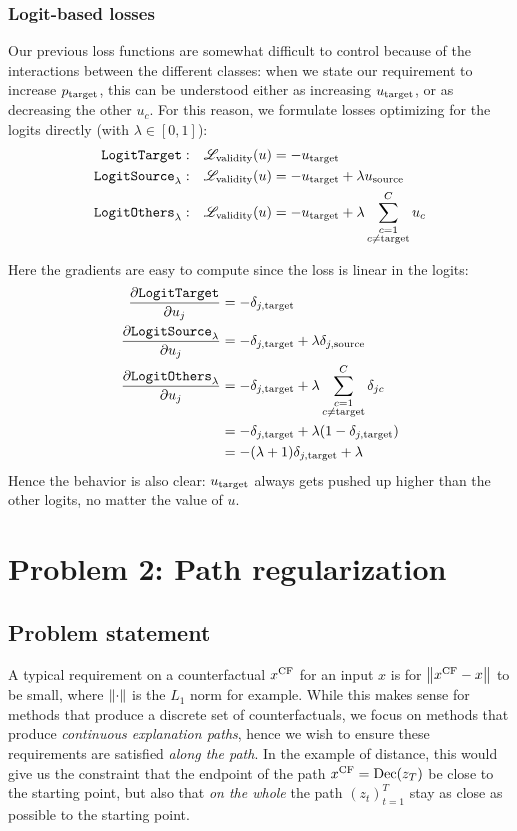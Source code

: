 \documentclass[../main.tex]{subfiles}
\begin{document}
\subsubsection{Logit-based losses}

Our previous loss functions are somewhat difficult to control because of the interactions between the different classes:
when we state our requirement to increase $p_{\mathrm{target}}$, this can be understood either as increasing $u_{\mathrm{target}}$, or as decreasing the other $u_c$.
For this reason, we formulate losses optimizing for the logits directly (with $\lambda \in [0, 1]$):
\begin{align*}
    \mathtt{LogitTarget}{}:        & \quad    \mathscr{L}_\text{validity}(u) = - u_{\mathrm{target}}                         \\
    \mathtt{LogitSource}_{\lambda}: & \quad     \mathscr{L}_\text{validity}(u) = - u_{\mathrm{target}} + \lambda u_{\mathrm{source}}    \\
    \mathtt{LogitOthers}_{\lambda}: & \quad    \mathscr{L}_\text{validity}(u) = - u_{\mathrm{target}} + \lambda \sum_{\substack{{c}=1 \\ {c} \neq \mathrm{target}}}^C u_c
\end{align*}

Here the gradients are easy to compute since the loss is linear in the logits:
\begin{align*}
\frac{\partial \mathtt{LogitTarget}{}}{\partial u_j} &= - \delta_{j, \mathrm{target}}                         \\
\frac{\partial \mathtt{LogitSource}_{\lambda}}{\partial u_j} &= - \delta_{j, \mathrm{target}} + \lambda \delta_{j, \mathrm{source}}                        \\
\frac{\partial \mathtt{LogitOthers}_{\lambda}}{\partial u_j}
&= - \delta_{j, \mathrm{target}} + \lambda \sum_{\substack{{c}=1 \\ {c} \neq \mathrm{target}}}^C \delta_{jc} \\
&= - \delta_{j, \mathrm{target}} + \lambda (1 - \delta_{j, \mathrm{target}}) \\
&= -(\lambda + 1)\delta_{j, \mathrm{target}} + \lambda
\end{align*}
Hence the behavior is also clear: $u_{\mathrm{target}}$ always gets pushed up higher than the other logits, no matter the value of $u$.



\section{Problem 2: Path regularization}

\subsection{Problem statement}

A typical requirement on a counterfactual $x^\mathrm{CF}$ for an input $x$ is for $\left\lVert x^\mathrm{CF} - x\right\rVert$ to be small, where $\left\lVert\cdot\right\rVert$ is the $L_1$ norm for example.
While this makes sense for methods that produce a discrete set of counterfactuals, we focus on methods that produce \emph{continuous explanation paths}, hence we wish to ensure these requirements are satisfied \emph{along the path}.
In the example of distance, this would give us the constraint that the endpoint of the path $x^\mathrm{CF} = \operatorname{Dec}(z_T)$ be close to the starting point, but also that \emph{on the whole} the path $(z_t)_{t=1}^T$ stay as close as possible to the starting point.
\end{document}
